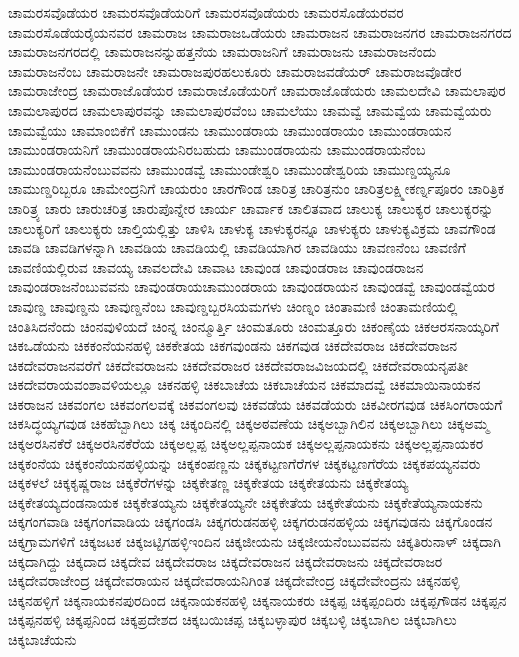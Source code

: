 {ಚಾಮರಸವೊಡೆಯರ
ಚಾಮರಸವೊಡೆಯರಿಗೆ
ಚಾಮರಸವೊಡೆಯರು
ಚಾಮರಸೊಡೆಯರವರ
ಚಾಮರಸೊಡೆಯರೈಯನವರ
ಚಾಮರಾಜ
ಚಾಮರಾಜಒಡೆಯರು
ಚಾಮರಾಜನ
ಚಾಮರಾಜನಗರ
ಚಾಮರಾಜನಗರದ
ಚಾಮರಾಜನಗರದಲ್ಲಿ
ಚಾಮರಾಜನನ್ನುಹತ್ತನೆಯ
ಚಾಮರಾಜನಿಗೆ
ಚಾಮರಾಜನು
ಚಾಮರಾಜನೆಂದು
ಚಾಮರಾಜನೆಂಬ
ಚಾಮರಾಜನೇ
ಚಾಮರಾಜಪುರಹಲುಕೂರು
ಚಾಮರಾಜವಡೆಯರ್
ಚಾಮರಾಜವೊಡೇರ
ಚಾಮರಾಜೇಂದ್ರ
ಚಾಮರಾಜೊಡೆಯರ
ಚಾಮರಾಜೊಡೆಯರಿಗೆ
ಚಾಮರಾಜೊಡೆಯರು
ಚಾಮಲದೇವಿ
ಚಾಮಲಾಪುರ
ಚಾಮಲಾಪುರದ
ಚಾಮಲಾಪುರವನ್ನು
ಚಾಮಲಾಪುರವೆಂಬ
ಚಾಮಲೆಯು
ಚಾಮವ್ವೆ
ಚಾಮವ್ವೆಯ
ಚಾಮವ್ವೆಯರು
ಚಾಮವ್ವೆಯು
ಚಾಮಾಂಬಿಕೆಗೆ
ಚಾಮುಂಡನು
ಚಾಮುಂಡರಾಯ
ಚಾಮುಂಡರಾಯಂ
ಚಾಮುಂಡರಾಯನ
ಚಾಮುಂಡರಾಯನಿಗೆ
ಚಾಮುಂಡರಾಯನಿರಬಹುದು
ಚಾಮುಂಡರಾಯನು
ಚಾಮುಂಡರಾಯನೆಂಬ
ಚಾಮುಂಡರಾಯನೆಂಬುವವನು
ಚಾಮುಂಡವ್ವೆ
ಚಾಮುಂಡೇಶ್ವರಿ
ಚಾಮುಂಡೇಶ್ವರಿಯ
ಚಾಮುಣ್ಡಯ್ಯನೂ
ಚಾಮುಣ್ಡರಿಬ್ಬರೂ
ಚಾಮೇಂದ್ರನಿಗೆ
ಚಾಯರುಂ
ಚಾರಗೌಂಡ
ಚಾರಿತ್ರ
ಚಾರಿತ್ರನುಂ
ಚಾರಿತ್ರಲಕ್ಷ್ಮೀಕರ್ಣ್ನಪೂರಂ
ಚಾರಿತ್ರಿಕ
ಚಾರಿತ್ರ್ಯ
ಚಾರು
ಚಾರುಚರಿತ್ರ
ಚಾರುಪೊನ್ನೇರ
ಚಾರ್ಯ
ಚಾರ್ವಾಕ
ಚಾಲಿತವಾದ
ಚಾಲುಕ್ಯ
ಚಾಲುಕ್ಯರ
ಚಾಲುಕ್ಯರನ್ನು
ಚಾಲುಕ್ಯರಿಗೆ
ಚಾಲುಕ್ಯರು
ಚಾಲ್ತಿಯಲ್ಲಿತ್ತು
ಚಾಳಿಸಿ
ಚಾಳುಕ್ಯ
ಚಾಳುಕ್ಯರನ್ನೂ
ಚಾಳುಕ್ಯರು
ಚಾಳುಕ್ಯವಿಕ್ರಮ
ಚಾವಗೌಂಡ
ಚಾವಡಿ
ಚಾವಡಿಗಳನ್ನಾಗಿ
ಚಾವಡಿಯ
ಚಾವಡಿಯಲ್ಲಿ
ಚಾವಡಿಯಾಗಿರ
ಚಾವಡಿಯು
ಚಾವಣನೆಂಬ
ಚಾವಣಿಗೆ
ಚಾವಣಿಯಲ್ಲಿರುವ
ಚಾವಯ್ಯ
ಚಾವಲದೇವಿ
ಚಾವಾಟ
ಚಾವುಂಡ
ಚಾವುಂಡರಾಜ
ಚಾವುಂಡರಾಜನ
ಚಾವುಂಡರಾಜನೆಂಬುವವನು
ಚಾವುಂಡರಾಯಚಾಮುಂಡರಾಯ
ಚಾವುಂಡರಾಯನ
ಚಾವುಂಡವ್ವೆ
ಚಾವುಂಡವ್ವೆಯರ
ಚಾವುಣ್ಡ
ಚಾವುಣ್ಡನು
ಚಾವುಣ್ಡನೆಂಬ
ಚಾವುಣ್ಡಬ್ಬರಸಿಯಮಗಳು
ಚಿಂಣ್ನಂ
ಚಿಂತಾಮಣಿ
ಚಿಂತಾಮಣಿಯಲ್ಲಿ
ಚಿಂತಿಸಿದನೆಂದು
ಚಿಂನವುಳಿಯದೆ
ಚಿಂನ್ನ
ಚಿಂನ್ಮೂರ್ತ್ತಿ
ಚಿಂಮತೂರು
ಚಿಂಮತ್ತೂರು
ಚಿಕಂಣೈಯ
ಚಿಕಆರಸನಾಯ್ಕರಿಗೆ
ಚಿಕಒಡೆಯನು
ಚಿಕಕಂನೆಯನಹಳ್ಳಿ
ಚಿಕಕೇತಯ
ಚಿಕಗವುಂಡನು
ಚಿಕಗವುಡ
ಚಿಕದೇವರಾಜ
ಚಿಕದೇವರಾಜನ
ಚಿಕದೇವರಾಜನವರೆಗೆ
ಚಿಕದೇವರಾಜನು
ಚಿಕದೇವರಾಜರ
ಚಿಕದೇವರಾಜವಿಜಯದಲ್ಲಿ
ಚಿಕದೇವರಾಯನೃಪತೀ
ಚಿಕದೇವರಾಯವಂಶಾವಳಿಯಲ್ಲೂ
ಚಿಕನಹಳ್ಳಿ
ಚಿಕಬಾಚೆಯ
ಚಿಕಬಾಚೆಯನ
ಚಿಕಮಾದವ್ವೆ
ಚಿಕಮಾಯಿನಾಯಕನ
ಚಿಕರಾಜನ
ಚಿಕವಂಗಲ
ಚಿಕವಂಗಲವಕ್ಕೆ
ಚಿಕವಂಗಲವು
ಚಿಕವಡೆಯ
ಚಿಕವಡೆಯರು
ಚಿಕವೀರಗವುಡ
ಚಿಕಸಿಂಗರಾಯಗೆ
ಚಿಕಸಿದ್ಧಯ್ಯಗವುಡ
ಚಿಕಹೆಬ್ಬಾಗಿಲು
ಚಿಕ್ಕ
ಚಿಕ್ಕಂದಿನಲ್ಲಿ
ಚಿಕ್ಕಅಠವಣೆಯ
ಚಿಕ್ಕಅಬ್ಬಾಗಿಲಿನ
ಚಿಕ್ಕಅಬ್ಬಾಗಿಲು
ಚಿಕ್ಕಅಮ್ಮ
ಚಿಕ್ಕಅರಸಿನಕೆರೆ
ಚಿಕ್ಕಅರಸಿನಕೆರೆಯ
ಚಿಕ್ಕಅಲ್ಲಪ್ಪ
ಚಿಕ್ಕಅಲ್ಲಪ್ಪನಾಯಕ
ಚಿಕ್ಕಅಲ್ಲಪ್ಪನಾಯಕನು
ಚಿಕ್ಕಅಲ್ಲಪ್ಪನಾಯಕರ
ಚಿಕ್ಕಕಂನೆಯ
ಚಿಕ್ಕಕಂನೆಯನಹಳ್ಳಿಯನ್ನು
ಚಿಕ್ಕಕಂಪಣ್ಣನು
ಚಿಕ್ಕಕಟ್ಟಣಗೆರೆಗಳ
ಚಿಕ್ಕಕಟ್ಟಣಗೆರೆಯ
ಚಿಕ್ಕಕಪಯ್ಯನವರು
ಚಿಕ್ಕಕಳಲೆ
ಚಿಕ್ಕಕೃಷ್ಣರಾಜ
ಚಿಕ್ಕಕೆರೆಗಳನ್ನು
ಚಿಕ್ಕಕೇತಣ್ಣ
ಚಿಕ್ಕಕೇತಯ
ಚಿಕ್ಕಕೇತಯನು
ಚಿಕ್ಕಕೇತಯ್ಯ
ಚಿಕ್ಕಕೇತಯ್ಯದಂಡನಾಯಕ
ಚಿಕ್ಕಕೇತಯ್ಯನು
ಚಿಕ್ಕಕೇತಯ್ಯನೇ
ಚಿಕ್ಕಕೇತೆಯ
ಚಿಕ್ಕಕೇತೆಯನು
ಚಿಕ್ಕಕೇತೆಯ್ಯನಾಯಕನು
ಚಿಕ್ಕಗಂಗವಾಡಿ
ಚಿಕ್ಕಗಂಗವಾಡಿಯ
ಚಿಕ್ಕಗಂಡಸಿ
ಚಿಕ್ಕಗರುಡನಹಳ್ಳಿ
ಚಿಕ್ಕಗರುಡನಹಳ್ಳಿಯ
ಚಿಕ್ಕಗವುಡನು
ಚಿಕ್ಕಗೊಂಡನ
ಚಿಕ್ಕಗ್ರಾಮಗಳಿಗೆ
ಚಿಕ್ಕಜಟಕ
ಚಿಕ್ಕಜಟ್ಟಿಗಹಳ್ಳಿಇಂದಿನ
ಚಿಕ್ಕಜೀಯನು
ಚಿಕ್ಕಜೀಯನೆಂಬುವವನು
ಚಿಕ್ಕತಿರುನಾಳ್
ಚಿಕ್ಕದಾಗಿ
ಚಿಕ್ಕದಾಗಿದ್ದು
ಚಿಕ್ಕದಾದ
ಚಿಕ್ಕದೇವ
ಚಿಕ್ಕದೇವರಾಜ
ಚಿಕ್ಕದೇವರಾಜನ
ಚಿಕ್ಕದೇವರಾಜನು
ಚಿಕ್ಕದೇವರಾಜರ
ಚಿಕ್ಕದೇವರಾಜೇಂದ್ರ
ಚಿಕ್ಕದೇವರಾಯನ
ಚಿಕ್ಕದೇವರಾಯನಿಗಿಂತ
ಚಿಕ್ಕದೇವೇಂದ್ರ
ಚಿಕ್ಕದೇವೇಂದ್ರನು
ಚಿಕ್ಕನಹಳ್ಳಿ
ಚಿಕ್ಕನಹಳ್ಳಿಗೆ
ಚಿಕ್ಕನಾಯಕನಪುರದಿಂದ
ಚಿಕ್ಕನಾಯಕನಹಳ್ಳಿ
ಚಿಕ್ಕನಾಯಕರು
ಚಿಕ್ಕಪ್ಪ
ಚಿಕ್ಕಪ್ಪಂದಿರು
ಚಿಕ್ಕಪ್ಪಗೌಡನ
ಚಿಕ್ಕಪ್ಪನ
ಚಿಕ್ಕಪ್ಪನಹಳ್ಳಿ
ಚಿಕ್ಕಪ್ಪನಿಂದ
ಚಿಕ್ಕಪ್ರದೇಶದ
ಚಿಕ್ಕಬಯಿಚಪ್ಪ
ಚಿಕ್ಕಬಳ್ಳಾಪುರ
ಚಿಕ್ಕಬಳ್ಳಿ
ಚಿಕ್ಕಬಾಗಿಲ
ಚಿಕ್ಕಬಾಗಿಲು
ಚಿಕ್ಕಬಾಚೆಯನು
}
